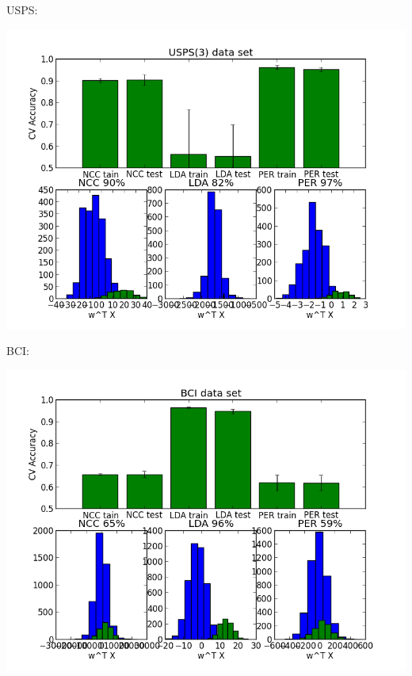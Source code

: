 \documentclass[a4paper,10pt]{article}
\begin{document}
USPS:

\leavevmode\vadjust{\vspace{-\baselineskip}}\newline
\includegraphics[scale=0.5]{usps}

BCI:

\leavevmode\vadjust{\vspace{-\baselineskip}}\newline
\includegraphics[scale=0.5]{bci}
\end{document}
